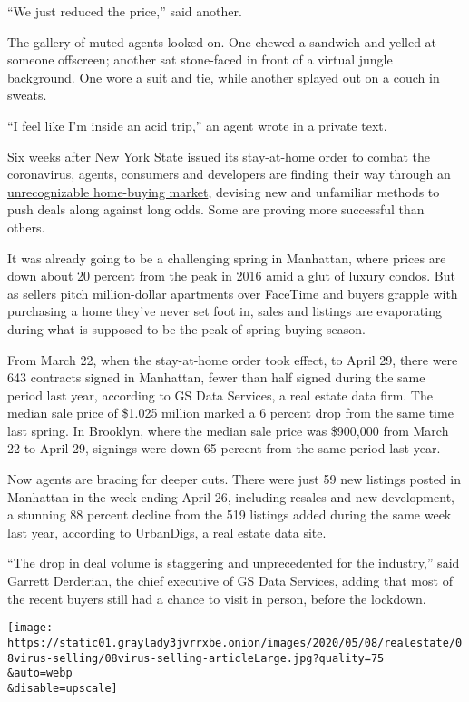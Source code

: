 ``We just reduced the price,'' said another.

The gallery of muted agents looked on. One chewed a sandwich and yelled
at someone offscreen; another sat stone-faced in front of a virtual
jungle background. One wore a suit and tie, while another splayed out on
a couch in sweats.

``I feel like I'm inside an acid trip,'' an agent wrote in a private
text.

Six weeks after New York State issued its stay-at-home order to combat
the coronavirus, agents, consumers and developers are finding their way
through an
\href{https://www.nytimes3xbfgragh.onion/2020/06/24/realestate/phase-2-showings.html}{unrecognizable
home-buying market}, devising new and unfamiliar methods to push deals
along against long odds. Some are proving more successful than others.

It was already going to be a challenging spring in Manhattan, where
prices are down about 20 percent from the peak in 2016
\href{https://www.nytimes3xbfgragh.onion/2020/01/10/realestate/new-york-decade-real-estate.html}{amid
a glut of luxury condos}. But as sellers pitch million-dollar apartments
over FaceTime and buyers grapple with purchasing a home they've never
set foot in, sales and listings are evaporating during what is supposed
to be the peak of spring buying season.

From March 22, when the stay-at-home order took effect, to April 29,
there were 643 contracts signed in Manhattan, fewer than half signed
during the same period last year, according to GS Data Services, a real
estate data firm. The median sale price of \$1.025 million marked a 6
percent drop from the same time last spring. In Brooklyn, where the
median sale price was \$900,000 from March 22 to April 29, signings were
down 65 percent from the same period last year.

Now agents are bracing for deeper cuts. There were just 59 new listings
posted in Manhattan in the week ending April 26, including resales and
new development, a stunning 88 percent decline from the 519 listings
added during the same week last year, according to UrbanDigs, a real
estate data site.

``The drop in deal volume is staggering and unprecedented for the
industry,'' said Garrett Derderian, the chief executive of GS Data
Services, adding that most of the recent buyers still had a chance to
visit in person, before the lockdown.

\texttt{[image: https://static01.graylady3jvrrxbe.onion/images/2020/05/08/realestate/08virus-selling/08virus-selling-articleLarge.jpg?quality=75\\\&auto=webp\\\&disable=upscale]}

